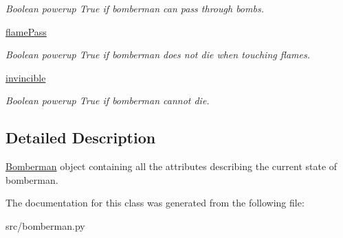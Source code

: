\begin{DoxyCompactItemize}
\begin{DoxyCompactList}\small\item\em Boolean powerup True if bomberman can pass through bombs. \end{DoxyCompactList}\item 
\hypertarget{classsrc_1_1bomberman_1_1_bomberman_a04139259920ddb2447a762bcbc8a53c4}{}\hyperlink{classsrc_1_1bomberman_1_1_bomberman_a04139259920ddb2447a762bcbc8a53c4}{flame\+Pass}\label{classsrc_1_1bomberman_1_1_bomberman_a04139259920ddb2447a762bcbc8a53c4}

\begin{DoxyCompactList}\small\item\em Boolean powerup True if bomberman does not die when touching flames. \end{DoxyCompactList}\item 
\hypertarget{classsrc_1_1bomberman_1_1_bomberman_a6a139150d8425b6bf1a8431a991fc0f1}{}\hyperlink{classsrc_1_1bomberman_1_1_bomberman_a6a139150d8425b6bf1a8431a991fc0f1}{invincible}\label{classsrc_1_1bomberman_1_1_bomberman_a6a139150d8425b6bf1a8431a991fc0f1}

\begin{DoxyCompactList}\small\item\em Boolean powerup True if bomberman cannot die. \end{DoxyCompactList}\end{DoxyCompactItemize}


\subsection{Detailed Description}
\hyperlink{classsrc_1_1bomberman_1_1_bomberman}{Bomberman} object containing all the attributes describing the current state of bomberman. 

The documentation for this class was generated from the following file\+:\begin{DoxyCompactItemize}
\item 
src/bomberman.\+py\end{DoxyCompactItemize}
